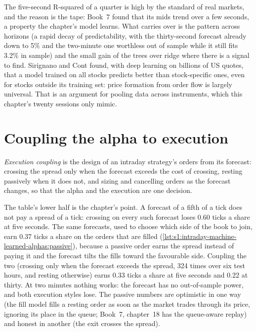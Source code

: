 The five-second R-squared of a quarter is high by the standard of real markets, and the reason is the tape: Book~7 found that its mids trend over a few
seconds, a property the chapter's model learns. What carries over is the pattern across horizons (a rapid decay of predictability, with the thirty-second
forecast already down to 5\% and the two-minute one worthless out of sample while it still fits 3.2\% in sample) and the small gain of the trees over ridge
where there is a signal to find. Sirignano and Cont found, with deep learning on billions of US quotes, that a model trained on all stocks predicts better
than stock-specific ones, even for stocks outside its training set: price formation from order flow is largely universal. That is an argument for pooling
data across instruments, which this chapter's twenty sessions only mimic.

\section{Coupling the alpha to execution}

\begin{definition}\label{def:s1:intraday-machine-learned-alphas:coupling}
\emph{Execution coupling} is the design of an intraday strategy's orders from its forecast: crossing the spread only when the
forecast exceeds the cost of crossing, resting passively when it does not, and sizing and cancelling orders as the forecast changes, so that the alpha and the
execution are one decision.
\end{definition}

The table's lower half is the chapter's point. A forecast of a fifth of a tick does not pay a spread of a tick: crossing on every such forecast loses 0.60
ticks a share at five seconds. The same forecasts, used to choose which side of the book to join, earn 0.37 ticks a share on the orders that are filled
(\cref{lst:s1:intraday-machine-learned-alphas:passive}), because a passive order earns the spread instead of paying it and the forecast tilts the fills
toward the favourable side. Coupling the two (crossing only when the forecast exceeds the spread, 324 times over six test hours, and resting otherwise)
earns 0.33 ticks a share at five seconds and 0.22 at thirty. At two minutes nothing works: the forecast has no out-of-sample power, and both execution styles
lose. The passive numbers are optimistic in one way (the fill model fills a resting order as soon as the market trades through its price, ignoring its place
in the queue; Book~7, chapter~18 has the queue-aware replay) and honest in another (the exit crosses the spread).

